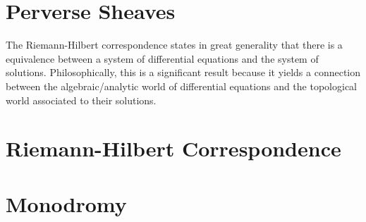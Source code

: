 \section{Perverse Sheaves}
The Riemann-Hilbert correspondence states in great generality that there is a equivalence between a system of differential equations and the system of solutions.
Philosophically, this is a significant result because it yields a connection between the algebraic/analytic world of differential equations and the topological world associated to their solutions.
\section{Riemann-Hilbert Correspondence}

\section{Monodromy}
